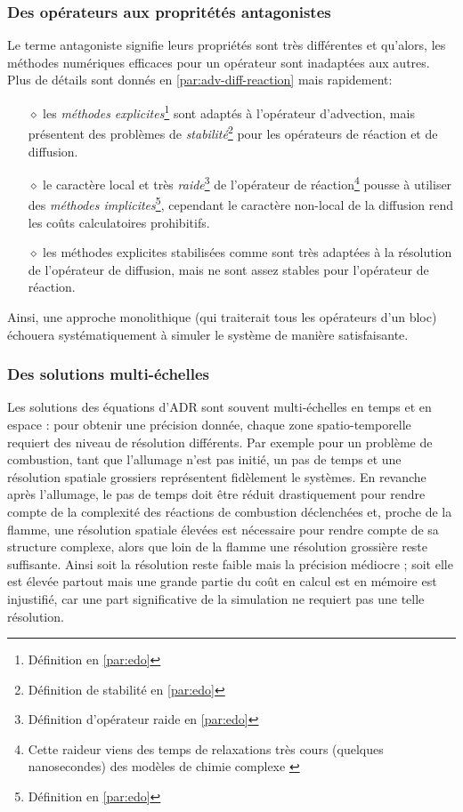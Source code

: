     \subsubsection{Des opérateurs aux propritétés antagonistes}
        Le terme antagoniste signifie leurs propriétés sont très différentes et qu'alors, les méthodes numériques efficaces pour un opérateur sont inadaptées aux autres.
        Plus de détails sont donnés en \ref{par:adv-diff-reaction} mais rapidement:
        \begin{itemize}
            \item[$\diamond$] les \textit{méthodes explicites}\footnote{Définition en \ref{par:edo}} sont adaptés à l'opérateur d'advection, 
            mais présentent des problèmes de \textit{stabilité}\footnote{Définition de stabilité en \ref{par:edo}} pour les  opérateurs de réaction et de diffusion.
            \item[$\diamond$] le caractère local et très \textit{raide}\footnote{Définition d'opérateur raide en \ref{par:edo}} de l'opérateur de réaction\footnote{
                Cette raideur viens des temps de relaxations très cours (quelques nanosecondes) des modèles de chimie complexe \cite{Wartha2021}}
            pousse à utiliser des \textit{méthodes implicites}\footnote{Définition en \ref{par:edo}}, cependant le caractère non-local 
            de la diffusion rend les coûts calculatoires prohibitifs.
            \item[$\diamond$] les méthodes explicites stabilisées comme \cite{AbdulleMedovikov2001} sont très adaptées à la résolution de l'opérateur de diffusion, mais 
            ne sont assez stables pour l'opérateur de réaction.
        \end{itemize}
        Ainsi, une approche monolithique (qui traiterait tous les opérateurs d'un bloc) échouera systématiquement à simuler le système de manière satisfaisante.
    \subsubsection{Des solutions multi-échelles}
    Les solutions des équations d'ADR sont souvent multi-échelles en temps et en espace \cite{duart2011} : pour obtenir une précision donnée, chaque zone spatio-temporelle 
    requiert des niveau de résolution différents. Par exemple pour un problème de combustion, tant que l'allumage n'est pas initié,
    un pas de temps et une résolution spatiale grossiers représentent fidèlement le systèmes. En revanche après l'allumage,
    le pas de temps doit être réduit drastiquement pour rendre compte de la complexité des réactions de combustion déclenchées et,
    proche de la flamme, une résolution spatiale élevées est nécessaire pour rendre compte de sa structure complexe, alors que 
    loin de la flamme une résolution grossière reste suffisante.
    Ainsi soit la résolution reste faible mais la précision médiocre ; 
    soit elle est élevée partout mais une grande partie du coût en calcul est en mémoire est injustifié, 
    car une part significative de la simulation ne requiert pas une telle résolution.

